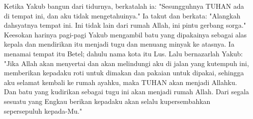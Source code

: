 \begin{biblechapter}
\verse Ketika Yakub bangun dari tidurnya, berkatalah ia: "Sesungguhnya TUHAN ada di tempat ini, dan aku tidak mengetahuinya."
\verse Ia takut dan berkata: "Alangkah dahsyatnya tempat ini. Ini tidak lain dari rumah Allah, ini pintu gerbang sorga."
\verse Keesokan harinya pagi-pagi Yakub mengambil batu yang dipakainya sebagai alas kepala dan mendirikan itu menjadi tugu dan menuang minyak ke atasnya.
\verse Ia menamai tempat itu Betel; dahulu nama kota itu Lus.
\verse Lalu bernazarlah Yakub: "Jika Allah akan menyertai dan akan melindungi aku di jalan yang kutempuh ini, memberikan kepadaku roti untuk dimakan dan pakaian untuk dipakai,
\verse sehingga aku selamat kembali ke rumah ayahku, maka TUHAN akan menjadi Allahku.
\verse Dan batu yang kudirikan sebagai tugu ini akan menjadi rumah Allah. Dari segala sesuatu yang Engkau berikan kepadaku akan selalu kupersembahkan sepersepuluh kepada-Mu."
\end{biblechapter}

